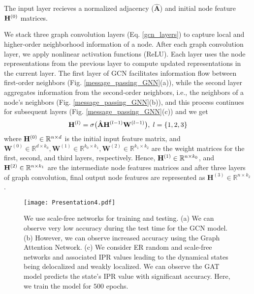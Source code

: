 \documentclass[aps, prd, showpacs, floatfix, superscriptaddress, twocolumn, nofootinbib, preprintnumbers, longbibliography]{revtex4-2}
\begin{document}
\vspace{2mm}
The input layer recieves a normalized adjacency ($\hat{\mathbf{A}}$) and initial node feature \({\bf H}^{(0)}\) matrices.

\vspace{2mm}
We stack three graph convolution layers (Eq. \ref{gcn_layers}) to capture local and higher-order neighborhood information of a node. After each graph convolution layer, we apply nonlinear activation functions (ReLU). Each layer uses the node representations from the previous layer to compute updated representations in the current layer. The first layer of GCN facilitates information flow between first-order neighbors (Fig. \ref{message_passing_GNN}(a)), while the second layer aggregates information from the second-order neighbors, i.e., the neighbors of a node's neighbors (Fig. \ref{message_passing_GNN}(b)), and this process continues for subsequent layers (Fig. \ref{message_passing_GNN}(c)) and we get 
\begin{equation}
\label{gcn_layers}
\mathbf{H}^{(l)} = \sigma \big( \hat{\mathbf{A}} {\bf H}^{(l-1)} \mathbf{W}^{(l-1)} \big),\; l = \{1, 2, 3\}
\end{equation}
where ${\bf H}^{(0)} \in \mathbb{R}^{n \times d}$ is the initial input feature matrix, and $\mathbf{W}^{(0)} \in \mathbb{R}^{d \times k_0}, \mathbf{W}^{(1)} \in \mathbb{R}^{k_0 \times k_1}, \mathbf{W}^{(2)} \in \mathbb{R}^{k_1 \times k_2}$ are the weight matrices for the first, second, and third layers, respectively. Hence, ${\bf H}^{(1)} \in \mathbb{R}^{n \times k_0}$, and ${\bf H}^{(2)} \in \mathbb{R}^{n \times k_1}$ are the intermediate node features matrices and after three layers of graph convolution, final output node features are represented as $\mathbf{H}^{(3)} \in \mathbb{R}^{n \times k_2}$.

\begin{figure*}[tbh]
\begin{center}
\texttt{[image: Presentation4.pdf]}
\caption{We use scale-free networks for training and testing. (a) We can observe very low accuracy during the test time for the GCN model. (b) However, we can observe increased accuracy using the Graph Attention Network. (c) We consider ER random and scale-free networks and associated IPR values leading to the dynamical states being delocalized and weakly localized. We can observe the GAT model predicts the state's IPR value with significant accuracy. Here, we train the model for $500$ epochs.}
\label{loc_deloc_results_undirected_multi}
\end{center}
\end{figure*}
\end{document}

